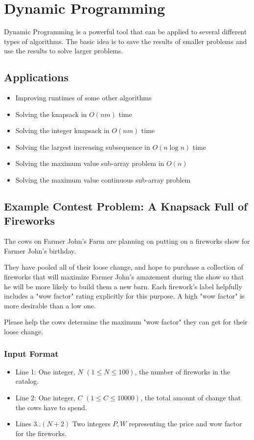 \section{Dynamic Programming}
Dynamic Programming is a powerful tool that can be applied to several different types of algorithms.\cite{dppractice}
The basic idea is to save the results of smaller problems and use the results to solve larger problems.

\subsection{Applications}
\begin{itemize}
	\item	Improving runtimes of some other algorithms
	\item	Solving the knapsack in $O(nm)$ time
	\item	Solving the integer knapsack in $O(nm)$ time
	\item	Solving the largest increasing subsequence in $O(n \log n)$ time
	\item	Solving the maximum value sub-array problem in $O(n)$
	\item	Solving the maximum value continuous sub-array problem
\end{itemize}

\subsection{Example Contest Problem: A Knapsack Full of Fireworks}
The cows on Farmer John's Farm are planning on putting on a fireworks show for Farmer John's birthday.

They have pooled all of their loose change, and hope to purchase a collection of fireworks that will maximize  Farmer John's amazement during the show so that he will be more likely to build them a new barn.
Each firework's label helpfully includes a "wow factor" rating explicitly for this purpose.
A high "wow factor" is more desirable than a low one.

Please help the cows determine the maximum "wow factor" they can get for their loose change.

\subsubsection{Input Format}
\begin{itemize}
	\item Line 1: One integer, $N$ $(1 \leq N \leq 100)$, the number of fireworks in the catalog.
   \item Line 2: One integer, $C$ $(1 \leq C \leq 10000)$, the total amount of change that the cows have to spend.
	\item Lines 3..$(N+2)$ Two integers $P,W$ representing the price and wow factor for the fireworks.
\end{itemize}

